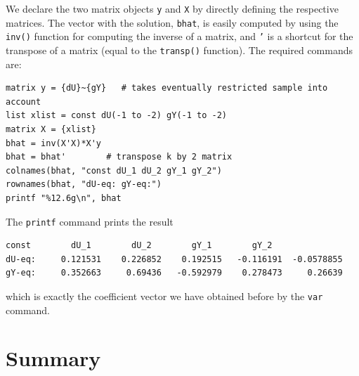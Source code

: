 \documentclass[11pt]{article}
\begin{document}
We declare the two matrix objects \texttt{y} and \texttt{X} by directly defining the respective matrices. The vector with the solution, \texttt{bhat}, is easily computed by using the \texttt{inv()} function for computing the inverse of a matrix, and \texttt{'} is a shortcut for the transpose of a matrix (equal to the \texttt{transp()} function). The required commands are:
\begin{Verbatim}[baselinestretch=0.75, fontsize=\small]
matrix y = {dU}~{gY}   # takes eventually restricted sample into account
list xlist = const dU(-1 to -2) gY(-1 to -2)
matrix X = {xlist}
bhat = inv(X'X)*X'y
bhat = bhat'		# transpose k by 2 matrix
colnames(bhat, "const dU_1 dU_2 gY_1 gY_2")
rownames(bhat, "dU-eq: gY-eq:")
printf "%12.6g\n", bhat
\end{Verbatim}
The \texttt{printf} command prints the result
\begin{Verbatim}[baselinestretch=0.75, fontsize=\small]
              const        dU_1        dU_2        gY_1        gY_2
dU-eq:     0.121531    0.226852    0.192515   -0.116191  -0.0578855
gY-eq:     0.352663     0.69436   -0.592979    0.278473     0.26639
\end{Verbatim}
which is exactly the coefficient vector we have obtained before by the \texttt{var} command.


\section{Summary}








\newpage

\appendix
\setcounter{table}{0}
\renewcommand{\thetable}{A\arabic{table}}
\setcounter{figure}{0}
\renewcommand{\thefigure}{A\arabic{figure}}
\end{document}
